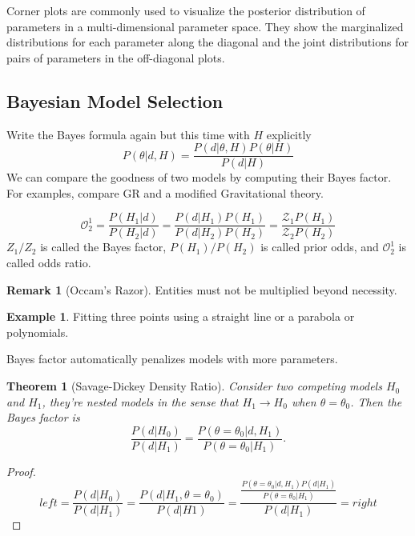 \documentclass[12pt, a4paper]{article}
\newcounter{lecture}              %
\theoremstyle{plain} %
\newtheorem{theorem}{Theorem}[lecture]      %
\theoremstyle{definition} %
\newtheorem{example}{Example}[lecture]
\newtheorem{remark}{Remark}[lecture]
\begin{document}
Corner plots are commonly used to visualize the posterior distribution of parameters in a multi-dimensional parameter space. They show the marginalized distributions for each parameter along the diagonal and the joint distributions for pairs of parameters in the off-diagonal plots.

\subsection*{Bayesian Model Selection}

Write the Bayes formula again but this time with $H$ explicitly
\begin{equation}
    P(\theta|d, H) = \frac{P(d|\theta, H) P(\theta|H)}{P(d|H)}
\end{equation}
We can compare the goodness of two models by computing their Bayes factor. For examples, compare GR and a modified Gravitational theory.

\begin{equation}
    \mathcal{O}^{1}_{2} = \frac{P(H_1|d)}{P(H_2|d)} = \frac{P(d|H_1) P(H_1)}{P(d|H_2) P(H_2)} = \frac{\mathcal{Z}_1 P(H_1)}{\mathcal{Z}_2 P(H_2)}
\end{equation}
$Z_1/Z_2$ is called the Bayes factor, $P(H_1)/P(H_2)$ is called prior odds, and $\mathcal{O}^1_2$ is called odds ratio. 

\begin{remark}[Occam's Razor]
    Entities must not be multiplied beyond necessity.
\end{remark}

\begin{example}
    Fitting three points using a straight line or a parabola or polynomials.
\end{example}

Bayes factor automatically penalizes models with more parameters.

\begin{theorem}[Savage-Dickey Density Ratio]
    Consider two competing models $H_0$ and $H_1$, they're nested models in the sense that $H_1 \rightarrow H_0$ when $\theta = \theta_0$. Then the Bayes factor is 
    \begin{equation}
    \frac{P(d|H_0)}{P(d|H_1)} = \frac{P(\theta=\theta_0|d, H_1)}{P(\theta=\theta_0|H_1)}. \tag{1}
    \end{equation}
\end{theorem}
    
\begin{proof}
    \begin{equation}
        left = \frac{P(d|H_0)}{P(d|H_1)} = \frac{P(d|H_1, \theta=\theta_0)}{P(d|H1)} = \frac{\frac{P(\theta=\theta_0|d, H_1)P(d|H_1)}{P(\theta=\theta_0|H_1)}}{P(d|H_1)} = right\tag{2}
    \end{equation}
\end{proof}
\end{document}
